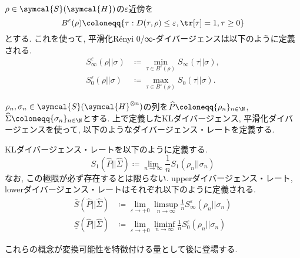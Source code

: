 \begin{mydfn}\label{dfn.smoothed_Renyi-alpha-div}
  $\rho\in\symcal{S}(\symcal{H})$の$\varepsilon$近傍を
  \begin{equation}
    B^{\varepsilon}(\rho)\coloneqq \{\tau: D(\tau, \rho)\leq \varepsilon, \tr[\tau]=1, \tau\geq 0\}
  \end{equation}
  とする. 
  これを使って, 平滑化R\'{e}nyi 0/∞-ダイバージェンスは以下のように定義される. 
  \begin{align}
    S_{\infty}^{\varepsilon}(\rho||\sigma)&\coloneqq \min_{\tau\in B^{\varepsilon}(\rho)}S_{\infty}(\tau||\sigma), \label{dfn.smoothed_Renyi_infty_div}\\
    S_{0}^{\varepsilon}(\rho||\sigma)&\coloneqq \max_{\tau\in B^{\varepsilon}(\rho)}S_{0}(\tau||\sigma). \label{dfn.smoothed_Renyi_0_div}
  \end{align}
\end{mydfn}

${\rho}_n, \sigma_n\in\symcal{S}(\symcal{H}^{\otimes n})$の列を$\widehat{P}\coloneqq \{{\rho}_{n}\}_{n\in\N}$, $\widehat{\Sigma}\coloneqq \{\sigma_{n}\}_{n\in\N}$とする.
上で定義したKLダイバージェンス, 平滑化ダイバージェンスを使って, 以下のようなダイバージェンス・レートを定義する. 

\begin{mydfn}\label{dfn.Quantum_spectral_divergence_rates}
  KLダイバージェンス・レートを以下のように定義する. 
  \begin{equation}
    S_1(\widehat{P}||\widehat{\Sigma})\coloneqq \lim_{n\to\infty}\frac{1}{n}S_1(\rho_n||\sigma_n)
  \end{equation}
  なお, この極限が必ず存在するとは限らない. 
  upperダイバージェンス・レート, lowerダイバージェンス・レートはそれぞれ以下のように定義される. 
  \begin{align}
    \bar{S}(\widehat{P}||\widehat{\Sigma})&\coloneqq \lim_{\varepsilon\to +0}\limsup_{n\to\infty}\frac{1}{n}S_{\infty}^{\varepsilon}(\rho_n||\sigma_n)\\
    \underline{S}(\widehat{P}||\widehat{\Sigma})&\coloneqq \lim_{\varepsilon\to +0}\liminf_{n\to\infty}\frac{1}{n}S_{0}^{\varepsilon}(\rho_n||\sigma_n)
  \end{align}
\end{mydfn}

これらの概念が変換可能性を特徴付ける量として後に登場する. 


